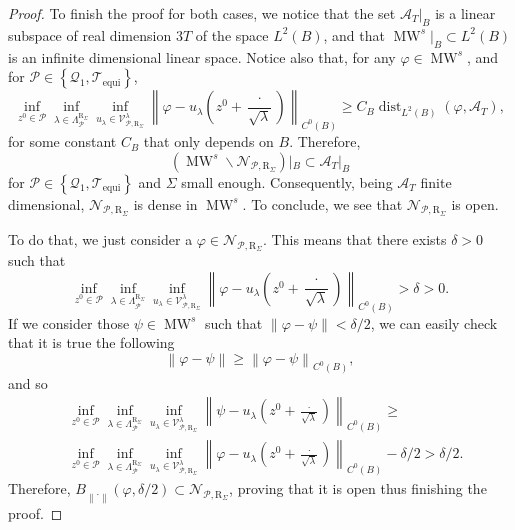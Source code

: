 \documentclass{amsart}
\theoremstyle{definition}
\theoremstyle{remark}
\DeclareMathOperator\dist{dist} \DeclareMathOperator\diam{diam}
\renewcommand\geq\geqslant
\numberwithin{equation}{section}
\theoremstyle{definition}
\theoremstyle{remark}
\DeclareMathOperator\MW{MW}
\begin{document}
\begin{proof}
	
	To finish the proof for both cases, we notice that the set $\mathcal{A}_T|_B$ is a linear subspace of real dimension $3T$ of the space $L^2(B)$, and that $\MW^s|_B\subset L^2(B)$ is an infinite dimensional linear space. Notice also that, for any $\varphi\in\MW^s$,  and for $\mathcal{P}\in\left\{\mathcal{Q}_1,\mathcal{T}_\mathrm{equi}\right\}$, 
	\begin{equation}
		\inf_{z^0\in\mathcal{P}}\inf_{\lambda\in\Lambda_{\mathcal{P}}^{\mathrm{R}_\Sigma}}\inf_{u_\lambda \in\mathcal{V}_{\mathcal{P},\mathrm{R}_\Sigma}^\lambda}\left\|\varphi-u_\lambda\left(z^0+\frac{\cdot}{\sqrt{\lambda}}\right)\right\|_{C^0\left(B\right)}\geq C_B\dist_{L^2(B)}\left(\varphi,\mathcal{A}_T\right),
	\end{equation}
    for some constant $C_B$  that only depends on $B$. Therefore, \begin{equation}(\MW^s\backslash\mathcal{N}_{\mathcal{P},\mathrm{R}_\Sigma})|_B\subset\mathcal{A}_T|_B\end{equation} for $\mathcal{P}\in\left\{\mathcal{Q}_1,\mathcal{T}_\mathrm{equi}\right\}$ and $\Sigma$ small enough.  Consequently, being $\mathcal A_T$ finite dimensional,  $\mathcal{N}_{\mathcal{P},\mathrm{R}_\Sigma}$ is dense in $\MW^s$. To conclude, we see that $\mathcal{N}_{\mathcal{P},\mathrm{R}_\Sigma}$ is open.
	
	To do that, we just consider a $\varphi\in\mathcal{N}_{\mathcal{P},\mathrm{R}_\Sigma}$. This means that there exists $\delta>0$ such that \begin{equation}		\inf_{z^0\in\mathcal{P}}\inf_{\lambda\in\Lambda_{\mathcal{P}}^{\mathrm{R}_\Sigma}}\inf_{u_\lambda \in\mathcal{V}_{\mathcal{P},\mathrm{R}_\Sigma}^\lambda}\left\|\varphi-u_\lambda\left(z^0+\frac{\cdot}{\sqrt{\lambda}}\right)\right\|_{C^0\left(B\right)}>\delta>0.\end{equation}If we consider those $\psi\in\MW^s$ such that $\left\|\varphi-\psi\right\|<\delta/2$, we can easily check that it is true the following
	\begin{equation}
		\left\|\varphi-\psi\right\|\geq \left\|\varphi-\psi\right\|	_{C^0\left(B\right)},
	\end{equation}and so \begin{equation}\begin{aligned}	&	\inf_{z^0\in\mathcal{P}}\inf_{\lambda\in\Lambda_{\mathcal{P}}^{\mathrm{R}_\Sigma}}\inf_{u_\lambda \in\mathcal{V}_{\mathcal{P},\mathrm{R}_\Sigma}^\lambda}\left\|\psi-u_\lambda\left(z^0+\frac{\cdot}{\sqrt{\lambda}}\right)\right\|_{C^0\left(B\right)}\geq\\&\inf_{z^0\in\mathcal{P}}\inf_{\lambda\in\Lambda_{\mathcal{P}}^{\mathrm{R}_\Sigma}}\inf_{u_\lambda \in\mathcal{V}_{\mathcal{P},\mathrm{R}_\Sigma}^\lambda}\left\|\varphi-u_\lambda\left(z^0+\frac{\cdot}{\sqrt{\lambda}}\right)\right\|_{C^0\left(B\right)}-\delta/2>\delta/2.\end{aligned}\end{equation}Therefore, $B_{\left\|\cdot\right\|}\left(\varphi,\delta/2\right)\subset\mathcal{N}_{\mathcal{P},\mathrm{R}_\Sigma}$, proving that it is open thus finishing the proof.
	
\end{proof}
\end{document}
